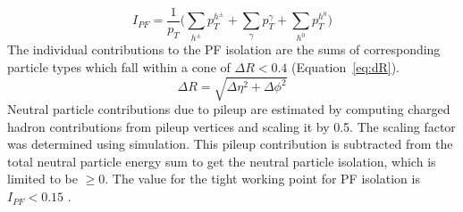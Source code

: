 % 
% 
\begin{equation}
    I_{PF} = \frac{1}{p_T} \Bigg(\sum_{h^{\pm}} p_T^{h^{\pm}} +\sum_{\gamma} p_T^{\gamma} + \sum_{h^{0}} p_T^{h^{0}}\Bigg)
    \label{ch:pfiso}
\end{equation}
The individual contributions to the PF isolation are the sums of corresponding particle types which fall within a cone of $\Delta R < 0.4$ (Equation~\ref{eq:dR}).
\begin{equation}
    \Delta R = \sqrt{\Delta\eta^2+\Delta\phi^2}
    \label{eq:dR}
\end{equation}
Neutral particle contributions due to pileup are estimated by computing charged hadron contributions from pileup vertices and scaling it by 0.5. The scaling factor was determined using simulation. This pileup contribution is subtracted from the total neutral particle energy sum to get the neutral particle isolation, which is limited to be $\geq0$.
The value for the tight working point for PF isolation is $I_{PF} < 0.15$ \cite{Sirunyan_2017}.



